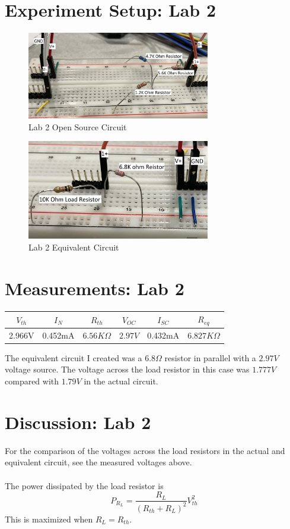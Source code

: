\documentclass[12pt]{article}
\begin{document}
\section*{Experiment Setup: Lab 2}
\begin{figure}[h]
\includegraphics[width=8cm]{Lab2 Circuit}
\centering
\caption{Lab 2 Open Source Circuit}
\end{figure}
\begin{figure}[h]
\includegraphics[width=8cm]{Lab2 Equivalent Circuit}
\centering
\caption{Lab 2 Equivalent Circuit}
\end{figure}
\section*{Measurements: Lab 2}
\begin{center}
\begin{tabular}{|c|c|c|c|c|c|}
\hline
$V_{th}$ & $I_N$&$R_{th}$&$V_{OC}$&$I_{SC}$&$R_{eq}$\\
\hline
2.966V & 0.452mA & $6.56K\Omega$ & $2.97V$ & 0.432mA & $6.827K\Omega$\\
\hline
\end{tabular}
\end{center}
The equivalent circuit I created was a $6.8\Omega$ resistor in parallel with a $2.97V$ voltage source. The voltage across the load resistor in this case was $1.777V$ compared with $1.79V$ in the actual circuit.
\pagebreak
\section*{Discussion: Lab 2}
For the comparison of the voltages across the load resistors in the actual and equivalent circuit, see the measured voltages above. \\
\\
The power dissipated by the load resistor is
$$P_{R_{L}}=\frac{R_L}{(R_{th}+R_L)^2}V_{th}^2$$
This is maximized when $R_L=R_{th}$.
\pagebreak
\end{document}
